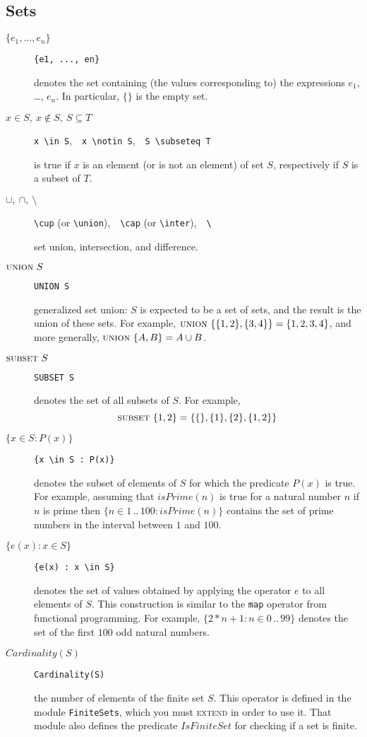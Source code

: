 \documentclass[11pt,fleqn]{article}
\newcommand{\kw}[1]{\textnormal{\textsc{#1}}}
\newcommand{\UNION}{\kw{union}}
\newcommand{\SUBSET}{\kw{subset}}
\newcommand{\EXTEND}{\kw{extend}}
\begin{document}
\subsection{Sets}

\begin{description}
\item[$\{e_1, \dots, e_n\}$]\qquad \verb|{e1, ..., en}|

  denotes the set containing (the values corresponding to) the expressions
  $e_1$, \dots, $e_n$. In particular, $\{\}$ is the empty set.

\item[$x \in S,\ x \notin S,\ S \subseteq T$]\qquad
  \verb|x \in S|,\ \ \verb|x \notin S|,\ \ \verb|S \subseteq T|

  is true if $x$ is an element (or is not an element) of set $S$, respectively
  if $S$ is a subset of $T$.
  
\item[$\cup,\ \cap,\ \setminus$]\qquad
  \verb|\cup| (or \verb|\union|),\ \ \verb|\cap| (or \verb|\inter|),\ \ \verb|\|

  set union, intersection, and difference.
  
\item[$\UNION~S$]\qquad \verb|UNION S|

  generalized set union: $S$ is expected to be a set of sets, and the result is
  the union of these sets. For example, $\UNION~\{\{1,2\}, \{3,4\}\} =
  \{1,2,3,4\}$, and more generally, $\UNION~\{A,B\} = A \cup B$.
  
\item[$\SUBSET~S$]\qquad \verb|SUBSET S|

  denotes the set of all subsets of $S$. For example,
  \[ \SUBSET~\{1,2\} = \{ \{\}, \{1\}, \{2\}, \{1,2\} \} \]

\item[$\{x \in S : P(x)\}$]\qquad \verb|{x \in S : P(x)}|

  denotes the subset of elements of $S$ for which the predicate $P(x)$ is true.
  For example, assuming that $\mathit{isPrime}(n)$ is true for a natural number
  $n$ if $n$ is prime then $\{n \in 1\,..\,100 : \mathit{isPrime}(n)\}$ contains
  the set of prime numbers in the interval between $1$ and $100$.
  
\item[$\{e(x) : x \in S\}$]\qquad \verb|{e(x) : x \in S}|

  denotes the set of values obtained by applying the operator $e$ to all
  elements of $S$. This construction is similar to the \verb|map| operator from
  functional programming. For example, $\{2*n+1 : n \in 0\,..\,99\}$ denotes the
  set of the first $100$ odd natural numbers.
  
\item[$\mathit{Cardinality}(S)$]\qquad \verb|Cardinality(S)|

  the number of elements of the finite set $S$. This operator is defined in the
  module \verb|FiniteSets|, which you must \EXTEND{} in order to use it. That
  module also defines the predicate $\mathit{IsFiniteSet}$ for checking if a set
  is finite.
\end{description}
\end{document}
